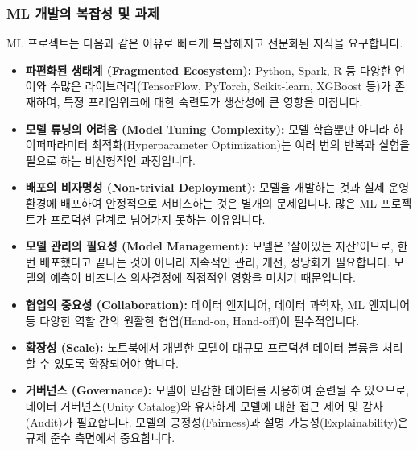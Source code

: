 \documentclass[11pt,a4paper]{article}
\begin{document}
\subsubsection*{ML 개발의 복잡성 및 과제}
ML 프로젝트는 다음과 같은 이유로 빠르게 복잡해지고 전문화된 지식을 요구합니다.
\begin{itemize}
    \item \textbf{파편화된 생태계 (Fragmented Ecosystem):} Python, Spark, R 등 다양한 언어와 수많은 라이브러리(TensorFlow, PyTorch, Scikit-learn, XGBoost 등)가 존재하여, 특정 프레임워크에 대한 숙련도가 생산성에 큰 영향을 미칩니다.
    \item \textbf{모델 튜닝의 어려움 (Model Tuning Complexity):} 모델 학습뿐만 아니라 하이퍼파라미터 최적화(Hyperparameter Optimization)는 여러 번의 반복과 실험을 필요로 하는 비선형적인 과정입니다.
    \item \textbf{배포의 비자명성 (Non-trivial Deployment):} 모델을 개발하는 것과 실제 운영 환경에 배포하여 안정적으로 서비스하는 것은 별개의 문제입니다. 많은 ML 프로젝트가 프로덕션 단계로 넘어가지 못하는 이유입니다.
    \item \textbf{모델 관리의 필요성 (Model Management):} 모델은 '살아있는 자산'이므로, 한 번 배포했다고 끝나는 것이 아니라 지속적인 관리, 개선, 정당화가 필요합니다. 모델의 예측이 비즈니스 의사결정에 직접적인 영향을 미치기 때문입니다.
    \item \textbf{협업의 중요성 (Collaboration):} 데이터 엔지니어, 데이터 과학자, ML 엔지니어 등 다양한 역할 간의 원활한 협업(Hand-on, Hand-off)이 필수적입니다.
    \item \textbf{확장성 (Scale):} 노트북에서 개발한 모델이 대규모 프로덕션 데이터 볼륨을 처리할 수 있도록 확장되어야 합니다.
    \item \textbf{거버넌스 (Governance):} 모델이 민감한 데이터를 사용하여 훈련될 수 있으므로, 데이터 거버넌스(Unity Catalog)와 유사하게 모델에 대한 접근 제어 및 감사(Audit)가 필요합니다. 모델의 공정성(Fairness)과 설명 가능성(Explainability)은 규제 준수 측면에서 중요합니다.
\end{itemize}
\end{document}
